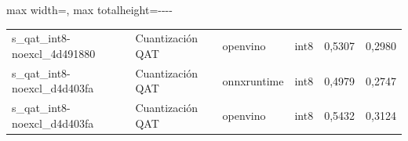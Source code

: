 \begin{landscape}
\begin{table}[htbp]
\begin{adjustbox}{max width=\linewidth, max totalheight=\dimexpr\textheight-\ht\tfmedgetitle-\dp\tfmedgetitle-\ht\tfmedgenotes-\dp\tfmedgenotes-6pt\relax}
\begin{tabular}{llllrr}
    s\_qat\_int8-noexcl\_4d491880 & Cuantización QAT & openvino & int8 & 0,5307 & 0,2980 \\
    s\_qat\_int8-noexcl\_d4d403fa & Cuantización QAT & onnxruntime & int8 & 0,4979 & 0,2747 \\
    s\_qat\_int8-noexcl\_d4d403fa & Cuantización QAT & openvino & int8 & 0,5432 & 0,3124 \\
    \bottomrule
  \end{tabular}
  \end{adjustbox}
  \par\vspace{2pt}
  \usebox{\tfmedgenotes}
\end{table}
\end{landscape}
